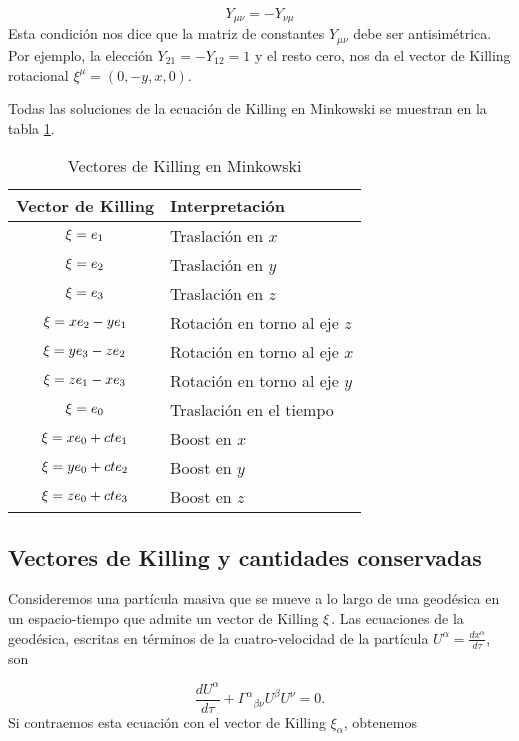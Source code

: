 \begin{equation}
Y_{\mu \nu}=-Y_{\nu \mu}
\end{equation}
Esta condición nos dice que la matriz de constantes $Y_{\mu \nu}$ debe ser antisimétrica. Por ejemplo, la elección $Y_{21}=-Y_{12}=1$ y el resto cero, nos da el vector de Killing rotacional $\xi^\mu=(0,-y, x, 0)$.

Todas las soluciones de la ecuación de Killing en Minkowski se muestran en la tabla \ref{tab:killingMinkowski}.

\begin{table}[H]
\centering
\caption{Vectores de Killing en Minkowski}

\begin{tabular}{c|l}
\hline
\textbf{Vector de Killing} & \textbf{Interpretación} \\ \hline
$\mathbf{\xi}=e_1$ & Traslación en $x$ \\ \hline
$\mathbf{\xi}=e_2$ & Traslación en $y$ \\ \hline
$\mathbf{\xi}=e_3$ & Traslación en $z$ \\ \hline
$\mathbf{\xi}=x e_2-y e_1$ & Rotación en torno al eje $z$ \\ \hline
$\mathbf{\xi}=y e_3-z e_2$ & Rotación en torno al eje $x$ \\ \hline
$\mathbf{\xi}=z e_1-x e_3$ & Rotación en torno al eje $y$ \\ \hline
$\mathbf{\xi}=e_0$ & Traslación en el tiempo \\ \hline
$\mathbf{\xi}=x e_0+c t e_1$ & Boost en $x$ \\ \hline
$\mathbf{\xi}=y e_0+c t e_2$ & Boost en $y$ \\ \hline
$\mathbf{\xi}=z e_0+c t e_3$ & Boost en $z$ \\ \hline
\end{tabular}
\label{tab:killingMinkowski}
\end{table}

\subsection{Vectores de Killing y cantidades conservadas}
Consideremos una partícula masiva que se mueve a lo largo de una geodésica en un espacio-tiempo que admite un vector de Killing $\mathbf{\xi}$. Las ecuaciones de la geodésica, escritas en términos de la cuatro-velocidad de la partícula $U^\alpha=\frac{d x^\alpha}{d \tau}$, son

\begin{equation}
\frac{d U^\alpha}{d \tau}+\Gamma^\alpha{ }_{\beta \nu} U^\beta U^\nu=0 .
\label{eq:geodesicaU}
\end{equation}
Si contraemos esta ecuación con el vector de Killing $\xi_\alpha$, obtenemos

